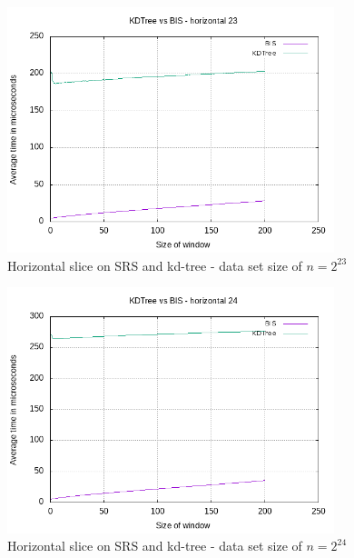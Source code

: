 \begin{figure}[h]
    \centering
    \includegraphics[width = 0.85\textwidth]{pictures/analysis/smalls/hori_23.png}
    \caption{Horizontal slice on SRS and kd-tree - data set size of $n=2^{23}$}\label{fig:small_hori_23}
\end{figure}

\begin{figure}[h]
    \centering
    \includegraphics[width = 0.85\textwidth]{pictures/analysis/smalls/hori_24.png}
    \caption{Horizontal slice on SRS and kd-tree - data set size of $n=2^{24}$}\label{fig:small_hori_24}
\end{figure}

